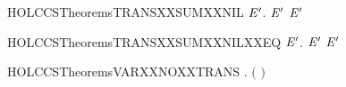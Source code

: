 \newcommand{\HOLCCSTheoremsTRANSXXSUMXXEQYY}{\UseVerbatim{HOLCCSTheoremsTRANSXXSUMXXEQYY}}
\begin{SaveVerbatim}{HOLCCSTheoremsTRANSXXSUMXXNIL}
\HOLTokenTurnstile{} \HOLSymConst{\HOLTokenForall{}}  \ensuremath{\HOLBoundVar{E}\sp{\prime{}}}.  \HOLSymConst{\ensuremath{+}}  \HOLTokenTransBegin{}\HOLTokenTransEnd \ensuremath{\HOLBoundVar{E}\sp{\prime{}}} \HOLSymConst{\HOLTokenImp{}}  \HOLTokenTransBegin{}\HOLTokenTransEnd \ensuremath{\HOLBoundVar{E}\sp{\prime{}}}
\end{SaveVerbatim}
\newcommand{\HOLCCSTheoremsTRANSXXSUMXXNIL}{\UseVerbatim{HOLCCSTheoremsTRANSXXSUMXXNIL}}
\begin{SaveVerbatim}{HOLCCSTheoremsTRANSXXSUMXXNILXXEQ}
\HOLTokenTurnstile{} \HOLSymConst{\HOLTokenForall{}}  \ensuremath{\HOLBoundVar{E}\sp{\prime{}}}.  \HOLSymConst{\ensuremath{+}}  \HOLTokenTransBegin{}\HOLTokenTransEnd \ensuremath{\HOLBoundVar{E}\sp{\prime{}}} \HOLSymConst{\HOLTokenEquiv{}}  \HOLTokenTransBegin{}\HOLTokenTransEnd \ensuremath{\HOLBoundVar{E}\sp{\prime{}}}
\end{SaveVerbatim}
\newcommand{\HOLCCSTheoremsTRANSXXSUMXXNILXXEQ}{\UseVerbatim{HOLCCSTheoremsTRANSXXSUMXXNILXXEQ}}
\begin{SaveVerbatim}{HOLCCSTheoremsVARXXNOXXTRANS}
\HOLTokenTurnstile{} \HOLSymConst{\HOLTokenForall{}}  . \HOLSymConst{\HOLTokenNeg{}}\ensuremath{(}  \HOLTokenTransBegin{}\HOLTokenTransEnd {}\ensuremath{)}
\end{SaveVerbatim}
\newcommand{\HOLCCSTheoremsVARXXNOXXTRANS}{\UseVerbatim{HOLCCSTheoremsVARXXNOXXTRANS}}
